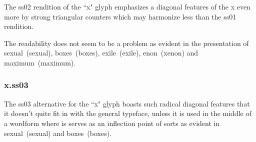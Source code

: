 The ss02 rendition of the ``x" glyph emphasizes a diagonal features of the x
even more by strong triangular counters which may harmonize less than the ss01
rendition.

The readability does not seem to be a problem as evident in the presentation
of
\mbox{{\ssdefault se{\sstwo x}ual} (sexual)},
\mbox{{\ssdefault bo{\sstwo x}es} (boxes)},
\mbox{{\ssdefault e{\sstwo x}ile} (exile)},
\mbox{{enon} (xenon)} and
\mbox{{\ssdefault ma{\sstwo x}imum} (maximum)}.

\subsubsection{{\ssthree x}.ss03}

The ss03 alternative for the ``x" glyph boasts such radical diagonal features
that it doesn't quite fit in with the general typeface, unless it is used in
the middle of a wordform where is serves as an inflection point of sorts as
evident in
\mbox{{\ssdefault se{\ssthree x}ual} (sexual)} and
\mbox{{\ssdefault bo{\ssthree x}es} (boxes)}.
